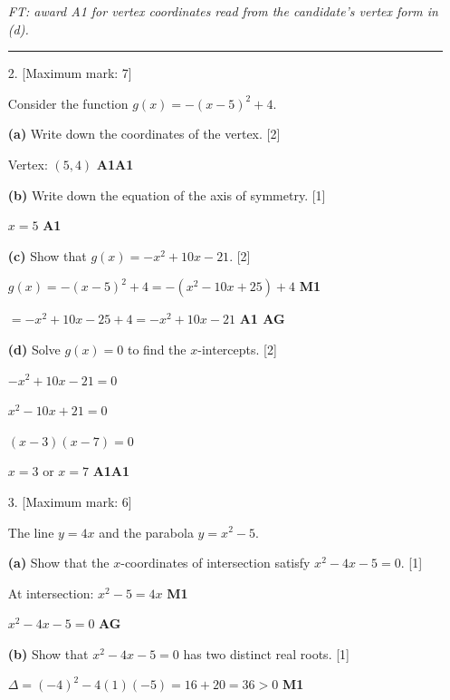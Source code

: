 \documentclass[12pt, twoside]{article}
\begin{document}
\begin{enumerate}[itemsep=0.3cm]
\emph{FT: award A1 for vertex coordinates read from the candidate's vertex form in (d).}

\bigskip
\hrule
\bigskip

\item[2.] [Maximum mark: 7]

Consider the function $g(x) = -(x - 5)^2 + 4$.

\medskip

\textbf{(a)} Write down the coordinates of the vertex. \hfill [2]

Vertex: $(5, 4)$ \hfill \textbf{A1A1}

\medskip

\textbf{(b)} Write down the equation of the axis of symmetry. \hfill [1]

$x = 5$ \hfill \textbf{A1}

\medskip

\textbf{(c)} Show that $g(x) = -x^2 + 10x - 21$. \hfill [2]

$g(x) = -(x - 5)^2 + 4 = -(x^2 - 10x + 25) + 4$ \hfill \textbf{M1}

$= -x^2 + 10x - 25 + 4 = -x^2 + 10x - 21$ \hfill \textbf{A1 AG}

\medskip

\textbf{(d)} Solve $g(x) = 0$ to find the $x$-intercepts. \hfill [2]

$-x^2 + 10x - 21 = 0$

$x^2 - 10x + 21 = 0$

$(x - 3)(x - 7) = 0$

$x = 3$ or $x = 7$ \hfill \textbf{A1A1}

\newpage

\item[3.] [Maximum mark: 6]

The line $y = 4x$ and the parabola $y = x^2 - 5$.

\medskip

\textbf{(a)} Show that the $x$-coordinates of intersection
satisfy $x^2 - 4x - 5 = 0$. \hfill [1]

At intersection: $x^2 - 5 = 4x$ \hfill \textbf{M1}

$x^2 - 4x - 5 = 0$ \hfill \textbf{AG}

\medskip

\textbf{(b)} Show that $x^2 - 4x - 5 = 0$ has two distinct
real roots. \hfill [1]

$\Delta = (-4)^2 - 4(1)(-5) = 16 + 20 = 36 > 0$ \hfill \textbf{M1}


\end{enumerate}
\end{document}
